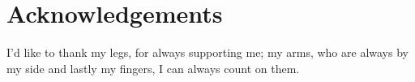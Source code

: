 \chapter*{Acknowledgements}
I'd like to thank my legs, for always supporting me; my arms, who are always by my side and lastly my fingers, I can always count on them.
